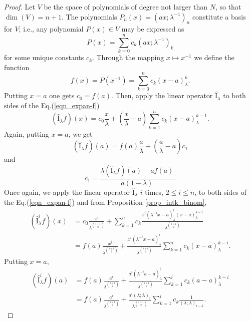 \documentclass[10pt,a4paper]{amsart}
\newcommand{\I}{\widehat{\mathrm{I}}}
\begin{document}
\begin{proof}
Let $V$ be the space of polynomials of degree not larger than $N$, so that $\dim(V)=n+1$. The polynomials $P_{n}(x)=(ax;\lambda^{-1})_{n}$ constitute a basis for $V$; i.e., any polynomial $P(x)\in V$ may be expressed as
\begin{equation}
    P(x)=\sum_{k=0}^{n}c_{k}(ax;\lambda^{-1})_{k}
\end{equation}
for some unique constants $c_{k}$. Through the mapping $x\mapsto x^{-1}$ we define the function 
\begin{equation}\label{eqn_expan-f}
    f(x)=P(x^{-1})=\sum_{k=0}^{n}c_{k}(x-a)_{\lambda}^k.
\end{equation}
Putting $x=a$ one gets $c_{0}=f(a)$. Then, apply the linear operator $\I_{\lambda}$ to both sides of the Eq.(\ref{eqn_expan-f})
\begin{equation}
    (\I_{\lambda}f)(x)=c_{0}\frac{x}{\lambda}+\left(\frac{x}{\lambda}-a\right)\sum_{k=1}^{n}c_{k}(x-a)_{\lambda}^{k-1}.
\end{equation}
Again, putting $x=a$, we get
\begin{equation}\label{eqn_sys2}
    (\I_{\lambda}f)(a)=f(a)\frac{a}{\lambda}+\left(\frac{a}{\lambda}-a\right)c_{1}
\end{equation}
and
\begin{equation}
    c_{1}=\frac{\lambda(\I_{\lambda}f)(a)-af(a)}{a(1-\lambda)}.    
\end{equation}
Once again, we apply the linear operator $\I_{\lambda}$ $i$ times, $2\leq i\leq n$, to both sides of the Eq.(\ref{eqn_expan-f}) and from Proposition \ref{prop_intk_binom},
\begin{align*}
    (\I_{\lambda}^if)(x)&=c_{0}\frac{x^i}{\lambda^{\binom{i+1}{2}}}+\sum_{k=1}^{n}c_{k}\frac{x^i(\lambda^{-i}x-a)_{\lambda}^i(x-a)_{\lambda}^{k-i}}{\lambda^{\binom{i+1}{2}}}\\
    &=f(a)\frac{x^i}{\lambda^{\binom{i+1}{2}}}+\frac{x^i(\lambda^{-i}x-a)_{\lambda}^i}{\lambda^{\binom{i+1}{2}}}\sum_{k=1}^{n}c_{k}(x-a)_{\lambda}^{k-i}.
\end{align*}
Putting $x=a$,
\begin{align}
    (\I_{\lambda}^if)(a)&=f(a)\frac{a^i}{\lambda^{\binom{i+1}{2}}}+\frac{a^i(\lambda^{-i}a-a)_{\lambda}^i}{\lambda^{\binom{i+1}{2}}}\sum_{k=1}^{i}c_{k}(a-a)_{\lambda}^{k-i}\nonumber\\
    &=f(a)\frac{a^i}{\lambda^{\binom{i+1}{2}}}+\frac{a^i(\lambda;\lambda)_{i}}{\lambda^{\binom{i+1}{2}}}\sum_{k=1}^{i}c_{k}\frac{1}{(\lambda;\lambda)_{i-k}}.\label{eqn_sys3}

\end{align}
\end{proof}
\end{document}
